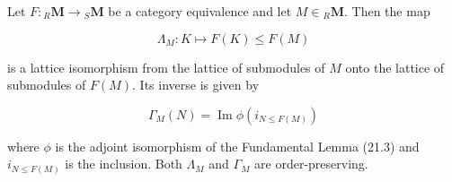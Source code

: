 Let $F: {}_R \mathbf{M} \to {}_S \mathbf{M}$ be a category equivalence and let $M \in {}_R \mathbf{M}$. Then the map

$$\Lambda_M: K \mapsto F(K) \leq F(M)$$

is a lattice isomorphism from the lattice of submodules of $M$ onto the lattice of submodules of $F(M)$. Its inverse is given by

$$\Gamma_M(N) = \operatorname{Im} \phi(i_{N \leq F(M)})$$

where $\phi$ is the adjoint isomorphism of the Fundamental Lemma (21.3) and $i_{N \leq F(M)}$ is the inclusion. Both $\Lambda_M$ and $\Gamma_M$ are order-preserving.
